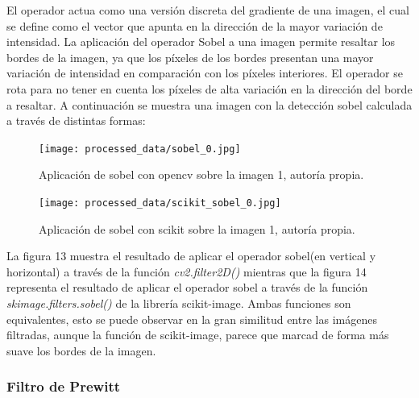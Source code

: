 \documentclass[a4paper,12pt]{article}
\begin{document}
{\vspace{0.5cm}

El operador actua como una versión discreta del gradiente de una imagen, el cual se define como el vector que apunta en la dirección de la mayor variación de intensidad.
La aplicación del operador Sobel a una imagen permite resaltar los bordes de la imagen, ya que los píxeles de los bordes presentan una mayor variación de intensidad
en comparación con los píxeles interiores. El operador se rota para no tener en cuenta los píxeles de alta variación en la dirección del borde a resaltar. A continuación se 
muestra una imagen con la detección sobel calculada a través de distintas formas:

\vspace{0.5cm}

\begin{figure}[H]

  \begin{minipage}[t]{0.4\textwidth}
      \centering
      \texttt{[image: processed\_data/sobel\_0.jpg]} 
      \caption{Aplicación de sobel con opencv sobre la imagen 1, autoría propia.}
      \label{fig:cv2-sobel}
  \end{minipage}
  \hfill
  \hspace{1.5cm}
  \begin{minipage}[t]{0.4\textwidth}
      \centering
      \texttt{[image: processed\_data/scikit\_sobel\_0.jpg]} 
      \caption{Aplicación de sobel con scikit sobre la imagen 1, autoría propia.}
      \label{fig:scikit-sobel}
  \end{minipage}
  
\end{figure}

\vspace{0.5cm}

La figura 13 muestra el resultado de aplicar el operador sobel(en vertical y horizontal) a través de la función \textit{cv2.filter2D()}
mientras que la figura 14 representa el resultado de aplicar el operador sobel a través de la función \textit{skimage.filters.sobel()} de la librería scikit-image.
Ambas funciones son equivalentes, esto se puede observar en la gran similitud entre las imágenes filtradas, aunque la función de scikit-image, parece que marcad
de forma más suave los bordes de la imagen.

\vspace{0.5cm}

\subsubsection{Filtro de Prewitt}

}
\end{document}
